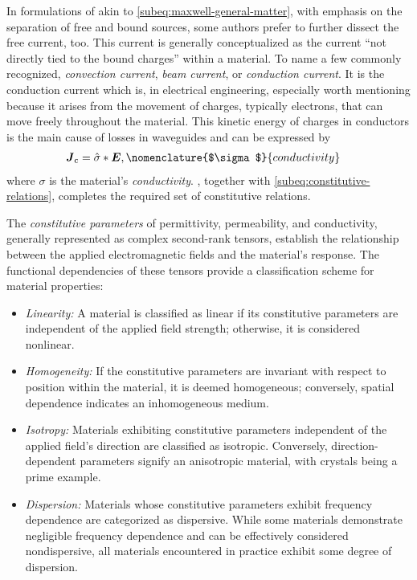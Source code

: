 \documentclass[11pt,a4paper,twoside,openany]{report}
\begin{document}
\begin{remark}
    In formulations of akin to \cref{subeq:maxwell-general-matter}, with emphasis on the separation of free and bound sources, some authors prefer to further dissect the free current, too. This current is generally conceptualized as the current \enquote{not directly tied to the bound charges} within a material. To name a few commonly recognized, \emph{convection current}, \emph{beam current}, or \emph{conduction current}. It is the conduction current which is, in electrical engineering, especially worth mentioning because it arises from the movement of charges, typically electrons, that can move freely throughout the material. This kinetic energy of charges in conductors is the main cause of losses in waveguides and can be expressed by
    \begin{align}
        \label{eq:constitutive-relation-conductivity}
        \vec J_{\mathrm c} &= \hat\sigma \ast \vec E,
        \nomenclature{$\sigma$}{conductivity }%
    \end{align}
    where $\sigma$ is the material's \emph{conductivity}. , together with \cref{subeq:constitutive-relations}, completes the required set of constitutive relations.
\end{remark}

The \emph{constitutive parameters} of permittivity, permeability, and conductivity, generally represented as complex second-rank tensors, establish the relationship between the applied electromagnetic fields and the material's response. The functional dependencies of these tensors provide a classification scheme for material properties:
\begin{itemize}
    \item \emph{Linearity:} A material is classified as linear if its constitutive parameters are independent of the applied field strength; otherwise, it is considered nonlinear.
    \item \emph{Homogeneity:} If the constitutive parameters are invariant with respect to position within the material, it is deemed homogeneous; conversely, spatial dependence indicates an inhomogeneous medium.
    \item \emph{Isotropy:} Materials exhibiting constitutive parameters independent of the applied field's direction are classified as isotropic. Conversely, direction-dependent parameters signify an anisotropic material, with crystals being a prime example.
    \item \emph{Dispersion:} Materials whose constitutive parameters exhibit frequency dependence are categorized as dispersive. While some materials demonstrate negligible frequency dependence and can be effectively considered nondispersive, all materials encountered in practice exhibit some degree of dispersion.
\end{itemize}
\end{document}
